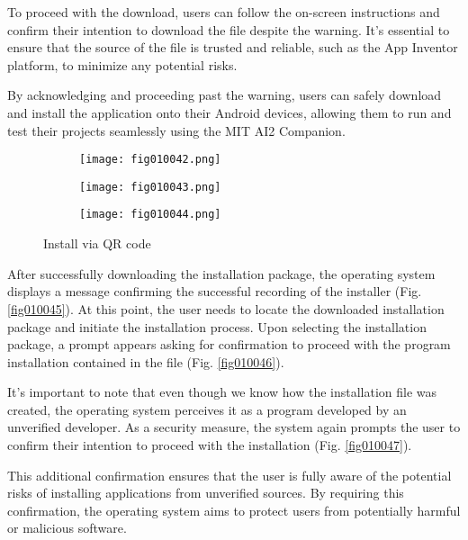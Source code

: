 To proceed with the download, users can follow the on-screen instructions and confirm their intention to download the file despite the warning. It's essential to ensure that the source of the file is trusted and reliable, such as the App Inventor platform, to minimize any potential risks.

By acknowledging and proceeding past the warning, users can safely download and install the application onto their Android devices, allowing them to run and test their projects seamlessly using the MIT AI2 Companion.

\begin{figure}[H]
   \begin{subfigure}{0.31\textwidth}
   \texttt{[image: fig010042.png]}
   \label{fig010042}
   \end{subfigure}
   \begin{subfigure}{0.31\textwidth}
   \texttt{[image: fig010043.png]}
   \label{fig010043}
   \end{subfigure}
   \begin{subfigure}{0.31\textwidth}
   \texttt{[image: fig010044.png]}
   \label{fig010044}
   \end{subfigure}
   \caption{Install via QR code}
\end{figure}

After successfully downloading the installation package, the operating system displays a message confirming the successful recording of the installer (Fig. \ref{fig010045}). At this point, the user needs to locate the downloaded installation package and initiate the installation process. Upon selecting the installation package, a prompt appears asking for confirmation to proceed with the program installation contained in the file (Fig. \ref{fig010046}).

It's important to note that even though we know how the installation file was created, the operating system perceives it as a program developed by an unverified developer. As a security measure, the system again prompts the user to confirm their intention to proceed with the installation (Fig. \ref{fig010047}).

This additional confirmation ensures that the user is fully aware of the potential risks of installing applications from unverified sources. By requiring this confirmation, the operating system aims to protect users from potentially harmful or malicious software.

